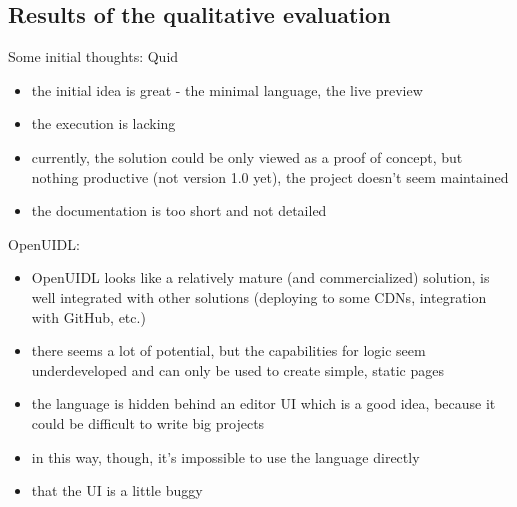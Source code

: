 \subsection{Results of the qualitative evaluation}\label{subsec:results-of-the-qualitative-evaluation}

Some initial thoughts:
Quid
\begin{itemize}
    \item the initial idea is great - the minimal language, the live preview
    \item the execution is lacking
    \item currently, the solution could be only viewed as a proof of concept, but nothing productive (not version 1.0 yet), the project doesn't seem maintained
    \item the documentation is too short and not detailed
\end{itemize}

OpenUIDL:
\begin{itemize}
    \item OpenUIDL looks like a relatively mature (and commercialized) solution, is well integrated with other solutions (deploying to some CDNs, integration with GitHub, etc.)
    \item there seems a lot of potential, but the capabilities for logic seem underdeveloped and can only be used to create simple, static pages
    \item the language is hidden behind an editor UI which is a good idea, because it could be difficult to write big projects
    \item in this way, though, it's impossible to use the language directly
    \item that the UI is a little buggy
\end{itemize}
